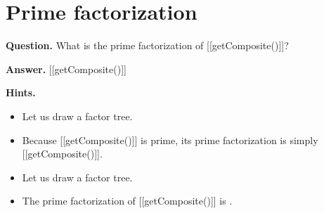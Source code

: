 \documentclass{article}
\begin{document}
\section*{Prime factorization}
\textbf{Question.} What is the prime factorization of [[getComposite()]]?

\textbf{Answer.} [[getComposite()]]

\textbf{Hints.}
\begin{itemize}
  \item Let us draw a factor tree.
  \item Because [[getComposite()]] is prime, its prime factorization is simply [[getComposite()]].
  \item Let us draw a factor tree.
  \item The prime factorization of [[getComposite()]] is .
\end{itemize}
\end{document}
